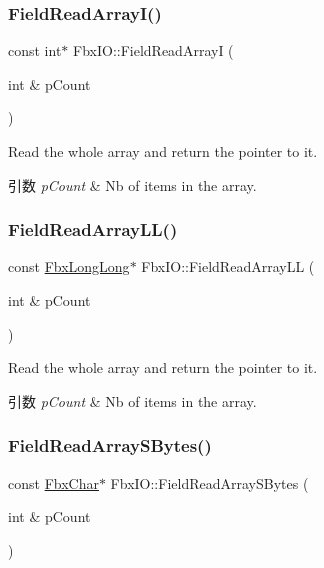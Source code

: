 \subsubsection{\texorpdfstring{Field\+Read\+Array\+I()}{FieldReadArrayI()}}
{\footnotesize\ttfamily const int$\ast$ Fbx\+I\+O\+::\+Field\+Read\+ArrayI (\begin{DoxyParamCaption}\item[{int \&}]{p\+Count }\end{DoxyParamCaption})}

Read the whole array and return the pointer to it. 
\begin{DoxyParams}{引数}
{\em p\+Count} & Nb of items in the array. \\
\hline
\end{DoxyParams}
\mbox{\label{class_fbx_i_o_a266f3db3325e427d0fe52c813c7a2f6b}} 
\subsubsection{\texorpdfstring{Field\+Read\+Array\+L\+L()}{FieldReadArrayLL()}}
{\footnotesize\ttfamily const \hyperlink{fbxtypes_8h_ac34da60c22b0a7e1156e5480da7d71f1}{Fbx\+Long\+Long}$\ast$ Fbx\+I\+O\+::\+Field\+Read\+Array\+LL (\begin{DoxyParamCaption}\item[{int \&}]{p\+Count }\end{DoxyParamCaption})}

Read the whole array and return the pointer to it. 
\begin{DoxyParams}{引数}
{\em p\+Count} & Nb of items in the array. \\
\hline
\end{DoxyParams}
\mbox{\label{class_fbx_i_o_a48d81a6ed1af29d2761b83b742220832}} 
\subsubsection{\texorpdfstring{Field\+Read\+Array\+S\+Bytes()}{FieldReadArraySBytes()}}
{\footnotesize\ttfamily const \hyperlink{fbxtypes_8h_a34067dfe395a7cf3040b7b263c9024d2}{Fbx\+Char}$\ast$ Fbx\+I\+O\+::\+Field\+Read\+Array\+S\+Bytes (\begin{DoxyParamCaption}\item[{int \&}]{p\+Count }\end{DoxyParamCaption})}

